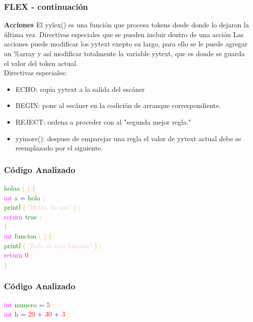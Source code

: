 \documentclass{beamer}
\begin{document}
\begin{frame}
\frametitle{FLEX - continuaci\'on} 
\textbf{Acciones} \newline 
El yylex() es una funci\'on que procesa tokens desde donde lo dejaron la \'ultima vez. Directivas especiales que se pueden incluir dentro de una acci\'on \newline 
Las acciones puede modificar los yytext exepto su largo, para ello se le puede agregar un \%array y as\'i modificar totalmente la variable yytext, que es donde se guarda el valor del token actual.\\Directivas especiales:\begin{itemize} \item ECHO: copia yytext a la salida del esc\'aner  \item BEGIN: pone al esc\'aner en la codici\'on de arranque correspondiente. \item REJECT: ordena a proceder con al "segunda mejor regla." \item yymore(): despues de emparejar una regla el valor de yytext actual debe se reemplazado por el siguiente.\end{itemize}\end{frame}
\begin{frame}
\frametitle{C\'odigo Analizado}
\textcolor{green}{holaa} \textcolor{orange}{(} \textcolor{orange}{)} \textcolor{orange}{\{} \\ 
 \textcolor{magenta}{int} \textcolor{green}{a} \textcolor{blue}{=} \textcolor{green}{hola} \textcolor{orange}{;} \\ 
 \textcolor{green}{printf} \textcolor{orange}{(} \textcolor{pink}{"Hello, its me"} \textcolor{orange}{)} \textcolor{orange}{;} \\ 
 \textcolor{magenta}{return} \textcolor{green}{true} \textcolor{orange}{;} \\ 
 \textcolor{orange}{\}} \\ 
 \textcolor{magenta}{int} \textcolor{green}{funcion} \textcolor{orange}{(} \textcolor{orange}{)} \textcolor{orange}{\{} \\ 
 \textcolor{green}{printf} \textcolor{orange}{(} \textcolor{pink}{"Esto es una función"} \textcolor{orange}{)} \textcolor{orange}{;} \\ 
 \textcolor{magenta}{return} \textcolor{red}{0} \textcolor{orange}{;} \\ 
 \textcolor{orange}{\}} \\ 
 \end{frame}
\begin{frame}
\frametitle{C\'odigo Analizado}
\textcolor{magenta}{int} \textcolor{green}{numero} \textcolor{blue}{=} \textcolor{red}{5} \textcolor{orange}{;} \\ 
 \textcolor{magenta}{int} \textcolor{green}{h} \textcolor{blue}{=} \textcolor{red}{20} \textcolor{blue}{+} \textcolor{red}{30} \textcolor{blue}{+} \textcolor{red}{3} \textcolor{orange}{;} \\ 
 \textcolor{white}{} \end{frame}
\end{document}
